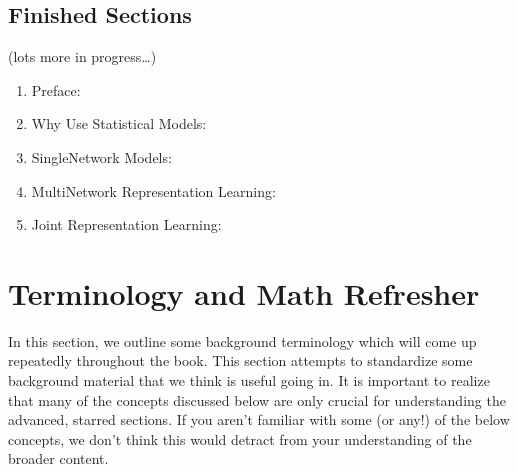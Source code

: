 \documentclass[letterpaper,10pt,english]{jupyterBook}
\begin{document}
\section{Finished Sections}
\label{\detokenize{introduction/preface:finished-sections}}
\sphinxAtStartPar
(lots more in progress…)
\begin{enumerate}
%
\item {} 
\sphinxAtStartPar
Preface: {\hyperref[\detokenize{introduction/preface::doc}]{}}

\item {} 
\sphinxAtStartPar
Why Use Statistical Models: {\hyperref[\detokenize{representations/ch5/why-use-models::doc}]{}}

\item {} 
\sphinxAtStartPar
Single\sphinxhyphen{}Network Models: 

\item {} 
\sphinxAtStartPar
Multi\sphinxhyphen{}Network Representation Learning: {\hyperref[\detokenize{representations/ch6/multigraph-representation-learning::doc}]{}}

\item {} 
\sphinxAtStartPar
Joint Representation Learning: {\hyperref[\detokenize{representations/ch6/joint-representation-learning::doc}]{}}

\end{enumerate}


\chapter{Terminology and Math Refresher}
\label{\detokenize{introduction/terminology:terminology-and-math-refresher}}\label{\detokenize{introduction/terminology::doc}}
\sphinxAtStartPar
In this section, we outline some background terminology which will come up repeatedly throughout the book. This section attempts to standardize some background material that we think is useful going in. It is important to realize that many of the concepts discussed below are only crucial for understanding the advanced, starred sections. If you aren’t familiar with some (or any!) of the below concepts, we don’t think this would detract from your understanding of the broader content.
\end{document}
